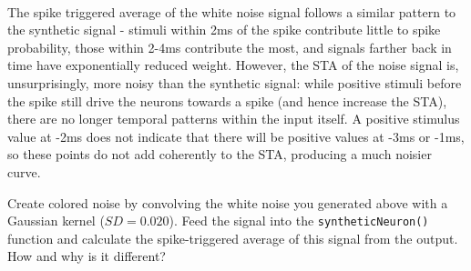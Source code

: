 \documentclass{article}
\begin{document}
    \begin{center}
    \end{center}
    { \hspace*{\fill} \\}
    
    The spike triggered average of the white noise signal follows a similar
pattern to the synthetic signal - stimuli within 2ms of the spike
contribute little to spike probability, those within 2-4ms contribute
the most, and signals farther back in time have exponentially reduced
weight. However, the STA of the noise signal is, unsurprisingly, more
noisy than the synthetic signal: while positive stimuli before the spike
still drive the neurons towards a spike (and hence increase the STA),
there are no longer temporal patterns within the input itself. A
positive stimulus value at -2ms does not indicate that there will be
positive values at -3ms or -1ms, so these points do not add coherently
to the STA, producing a much noisier curve.

    Create colored noise by convolving the white noise you generated above
with a Gaussian kernel ($SD=0.020$). Feed the signal into the
\texttt{syntheticNeuron()} function and calculate the spike-triggered
average of this signal from the output. How and why is it different?
\end{document}
